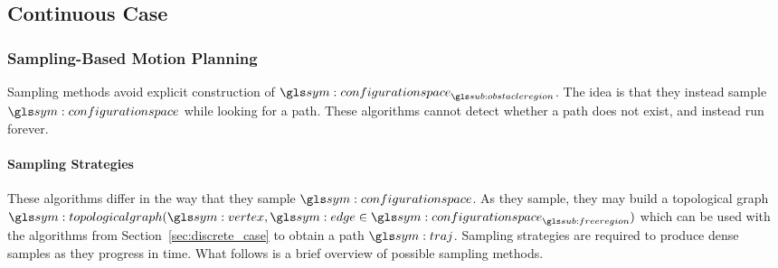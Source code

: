 
	\subsection{Continuous Case}%
	\label{sec:continuous_case}

		\subsubsection{Sampling-Based Motion Planning}%
		\label{sec:sampling_based_motion_planning}

			Sampling methods avoid explicit construction of
			$\configurationspace_{\obstacleregion}$. The idea is that they
			instead sample $\configurationspace$ while looking for a path. These
			algorithms cannot detect whether a path does not exist, and instead
			run forever.

			\paragraph{Sampling Strategies}%
			\label{sec:sampling_strategies}

				These algorithms differ in the way that they sample
				$\configurationspace$. As they sample, they may build a
				topological graph \( \topologicalgraph(\vertex, \edge \in
				\configurationspace_{\freeregion}) \) which can be used with the
				algorithms from Section~\ref{sec:discrete_case} to obtain a path
				$\pathsym$.  Sampling strategies are required to produce dense
				samples as they progress in time.  What follows is a brief
				overview of possible sampling methods.

